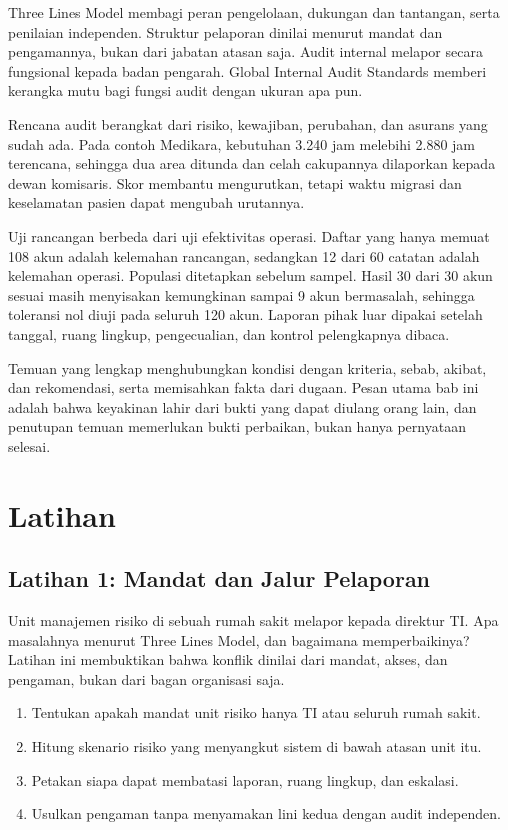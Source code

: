 Three Lines Model membagi peran pengelolaan, dukungan dan tantangan, serta penilaian independen.
Struktur pelaporan dinilai menurut mandat dan pengamannya, bukan dari jabatan atasan saja. Audit
internal melapor secara fungsional kepada badan pengarah. Global Internal Audit Standards memberi
kerangka mutu bagi fungsi audit dengan ukuran apa pun.

Rencana audit berangkat dari risiko, kewajiban, perubahan, dan asurans yang sudah ada. Pada contoh
Medikara, kebutuhan 3.240 jam melebihi 2.880 jam terencana, sehingga dua area ditunda dan celah
cakupannya dilaporkan kepada dewan komisaris. Skor membantu mengurutkan, tetapi waktu migrasi dan
keselamatan pasien dapat mengubah urutannya.

Uji rancangan berbeda dari uji efektivitas operasi. Daftar yang hanya memuat 108 akun adalah
kelemahan rancangan, sedangkan 12 dari 60 catatan adalah kelemahan operasi. Populasi ditetapkan
sebelum sampel. Hasil 30 dari 30 akun sesuai masih menyisakan kemungkinan sampai 9 akun bermasalah,
sehingga toleransi nol diuji pada seluruh 120 akun. Laporan pihak luar dipakai setelah tanggal,
ruang lingkup, pengecualian, dan kontrol pelengkapnya dibaca.

Temuan yang lengkap menghubungkan kondisi dengan kriteria, sebab, akibat, dan rekomendasi, serta
memisahkan fakta dari dugaan. Pesan utama bab ini adalah bahwa keyakinan lahir dari bukti yang dapat
diulang orang lain, dan penutupan temuan memerlukan bukti perbaikan, bukan hanya pernyataan selesai.

\section{Latihan}

\subsection*{Latihan 1: Mandat dan Jalur Pelaporan}

Unit manajemen risiko di sebuah rumah sakit melapor kepada direktur TI. Apa masalahnya menurut Three
Lines Model, dan bagaimana memperbaikinya? Latihan ini membuktikan bahwa konflik dinilai dari
mandat, akses, dan pengaman, bukan dari bagan organisasi saja.
\begin{enumerate}
  \item Tentukan apakah mandat unit risiko hanya TI atau seluruh rumah sakit.
  \item Hitung skenario risiko yang menyangkut sistem di bawah atasan unit itu.
  \item Petakan siapa dapat membatasi laporan, ruang lingkup, dan eskalasi.
  \item Usulkan pengaman tanpa menyamakan lini kedua dengan audit independen.
\end{enumerate}

